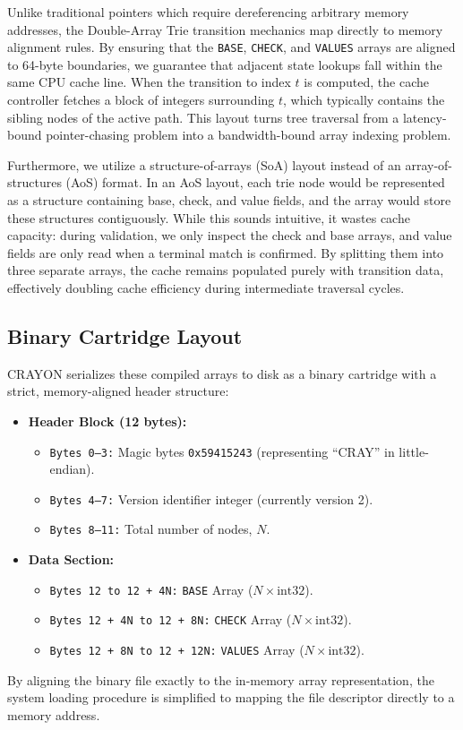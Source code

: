 \documentclass[10pt,journal,compsoc]{IEEEtran}
\begin{document}
Unlike traditional pointers which require dereferencing arbitrary memory addresses, the Double-Array Trie transition mechanics map directly to memory alignment rules. By ensuring that the \texttt{BASE}, \texttt{CHECK}, and \texttt{VALUES} arrays are aligned to 64-byte boundaries, we guarantee that adjacent state lookups fall within the same CPU cache line. When the transition to index $t$ is computed, the cache controller fetches a block of integers surrounding $t$, which typically contains the sibling nodes of the active path. This layout turns tree traversal from a latency-bound pointer-chasing problem into a bandwidth-bound array indexing problem. 

Furthermore, we utilize a structure-of-arrays (SoA) layout instead of an array-of-structures (AoS) format. In an AoS layout, each trie node would be represented as a structure containing base, check, and value fields, and the array would store these structures contiguously. While this sounds intuitive, it wastes cache capacity: during validation, we only inspect the check and base arrays, and value fields are only read when a terminal match is confirmed. By splitting them into three separate arrays, the cache remains populated purely with transition data, effectively doubling cache efficiency during intermediate traversal cycles.

\subsection{Binary Cartridge Layout}
CRAYON serializes these compiled arrays to disk as a binary cartridge with a strict, memory-aligned header structure:
\begin{itemize}
    \item \textbf{Header Block (12 bytes):}
    \begin{itemize}
        \item \texttt{Bytes 0--3:} Magic bytes \texttt{0x59415243} (representing ``CRAY'' in little-endian).
        \item \texttt{Bytes 4--7:} Version identifier integer (currently version 2).
        \item \texttt{Bytes 8--11:} Total number of nodes, $N$.
    \end{itemize}
    \item \textbf{Data Section:}
    \begin{itemize}
        \item \texttt{Bytes 12 to 12 + 4N:} \texttt{BASE} Array ($N \times \text{int32}$).
        \item \texttt{Bytes 12 + 4N to 12 + 8N:} \texttt{CHECK} Array ($N \times \text{int32}$).
        \item \texttt{Bytes 12 + 8N to 12 + 12N:} \texttt{VALUES} Array ($N \times \text{int32}$).
    \end{itemize}
\end{itemize}
By aligning the binary file exactly to the in-memory array representation, the system loading procedure is simplified to mapping the file descriptor directly to a memory address.
\end{document}
